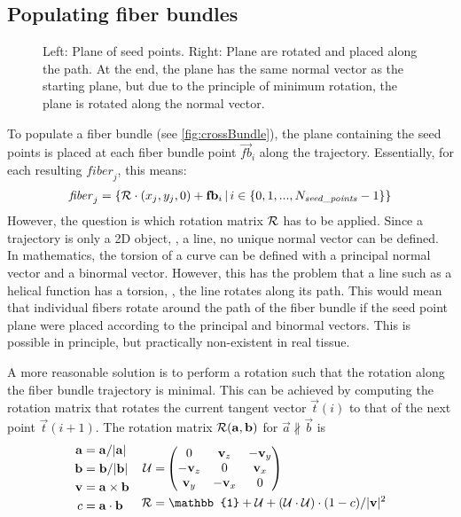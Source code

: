 \subsection{Populating fiber bundles}\label{sec:fillBundle}
%
\begin{figure}[!t]
    \centering
    \setlength{\tikzwidth}{0.75\textwidth}
	\caption{Left: Plane of seed points. Right: Plane are rotated and placed along the path. At the end, the plane has the same normal vector as the starting plane, but due to the principle of minimum rotation, the plane is rotated along the normal vector.}
	\label{fig:torsion}
\end{figure}
%
To populate a fiber bundle (see \cref{fig:crossBundle}), the plane containing the seed points is placed at each fiber bundle point $\vec{fb}_i$ along the trajectory.
Essentially, for each resulting $\mathit{fiber}_j$, this means:
% 
\begin{align}
    \mathit{fiber}_j = \left\{ \mathcal{R} \cdot (x_j, y_j, 0) + \mathbf{fb}_i \, | \, i \in \{0,1,...,N_{\mathit{seed\_points}}-1\}\right\}
\end{align}
% 
However, the question is which rotation matrix $\mathcal{R}$ has to be applied.
Since a trajectory is only a 2D object, \ie{}, a line, no unique normal vector can be defined.
In mathematics, the torsion of a curve can be defined with a principal normal vector and a binormal vector.
However, this has the problem that a line such as a helical function has a torsion, \ie{}, the line rotates along its path.
This would mean that  individual fibers rotate around the path of the fiber bundle if the seed point plane were placed according to the principal and binormal vectors.
This is possible in principle, but practically non-existent in real tissue.
\par
% 
A more reasonable solution is to perform a rotation such that the rotation along the fiber bundle trajectory is minimal.
This can be achieved by computing the rotation matrix that rotates the current tangent vector $\vec{t}(i)$ to that of the next point $\vec{t}(i+1)$.
The rotation matrix $\mathcal{R}(\mathbf{a}, \mathbf{b})$ for $\vec{a} \nparallel \vec{b}$ is
\begin{align}
\begin{split}
    \vec{a} =& \; \vec{a} / |\vec{a}|\\
    \vec{b} =& \; \vec{b} / |\vec{b}|\\
    \vec{v} =& \; \vec{a} \times \vec{b}\\
    c =& \; \vec{a} \cdot \vec{b}
\end{split}
\quad
\begin{split}
    \mat{U} =& \begin{pmatrix} 0 & \vec{v}_z & -\vec{v}_y\\ -\vec{v}_z & 0 & \vec{v}_x\\ \vec{v}_y & -\vec{v}_x & 0\end{pmatrix}\\
    \mat{R} =& \; \mathbb{1} + \mat{U} + (\mat{U} \cdot \mat{U}) \cdot (1 - c) / |\vec{v}|^2
\end{split}
\end{align}
